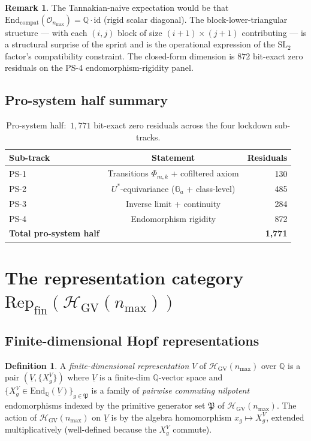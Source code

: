 \documentclass[11pt,a4paper]{article}
\theoremstyle{plain}
\theoremstyle{definition}
\newtheorem{definition}[theorem]{Definition}
\newtheorem{remark}[theorem]{Remark}
\newcommand{\nmax}{n_{\max}}
\newcommand{\HGV}{\mathcal{H}_{\mathrm{GV}}}
\newcommand{\Oh}{\mathcal{O}}
\newcommand{\Repcat}{\mathrm{Rep}_{\mathrm{fin}}}
\newcommand{\End}{\mathrm{End}}
\newcommand{\SL}{\mathrm{SL}}
\newcommand{\Ga}{\mathbb{G}_{a}}
\newcommand{\Q}{\mathbb{Q}}
\newcommand{\Ustar}{U^{*}}
\begin{document}
\begin{remark}\label{rem:endo_surprise}
The Tannakian-naive expectation would be that
$\End_{\mathrm{compat}}(\Oh_{\nmax}) = \Q \cdot \mathrm{id}$ (rigid
scalar diagonal). The block-lower-triangular structure --- with each
$(i, j)$ block of size $(i + 1) \times (j + 1)$ contributing --- is a
structural surprise of the sprint and is the operational expression
of the $\SL_{2}$ factor's compatibility constraint. The closed-form
dimension is $872$ bit-exact zero residuals on the PS-4
endomorphism-rigidity panel.
\end{remark}

\subsection{Pro-system half summary}\label{sec:ps_summary}

\begin{table}[h]
\centering
\begin{tabular}{l c r}
\toprule
Sub-track & Statement & Residuals \\
\midrule
PS-1 & Transitions $\Phi_{m, k}$ + cofiltered axiom & 130 \\
PS-2 & $\Ustar$-equivariance ($\Ga$ + class-level) & 485 \\
PS-3 & Inverse limit + continuity & 284 \\
PS-4 & Endomorphism rigidity & 872 \\
\midrule
\textbf{Total pro-system half} & & \textbf{1{,}771} \\
\bottomrule
\end{tabular}
\caption{Pro-system half:\ $1{,}771$ bit-exact zero residuals across
the four lockdown sub-tracks.}
\label{tab:ps_summary}
\end{table}

\section{The representation category $\Repcat(\HGV(\nmax))$}\label{sec:rep_cat}

\subsection{Finite-dimensional Hopf representations}\label{sec:findim}

\begin{definition}\label{def:findim_rep}
A \emph{finite-dimensional representation} $V$ of $\HGV(\nmax)$ over
$\Q$ is a pair $(\underline{V}, \{X_{g}^{V}\})$ where $\underline{V}$ is
a finite-dim $\Q$-vector space and
$\{X_{g}^{V} \in \End_{\Q}(\underline{V})\}_{g\in\mathfrak{P}}$ is a
family of \emph{pairwise commuting nilpotent} endomorphisms indexed by
the primitive generator set $\mathfrak{P}$ of $\HGV(\nmax)$. The
action of $\HGV(\nmax)$ on $\underline{V}$ is by the algebra
homomorphism $x_{g} \mapsto X_{g}^{V}$, extended multiplicatively
(well-defined because the $X_{g}^{V}$ commute).
\end{definition}
\end{document}
